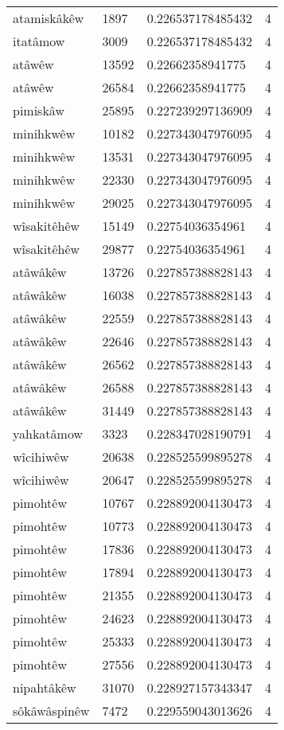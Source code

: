 \begin{longtable}{llll}
atamiskâkêw & 1897 & 0.226537178485432 & 4 \\
itatâmow & 3009 & 0.226537178485432 & 4 \\
atâwêw & 13592 & 0.22662358941775 & 4 \\
atâwêw & 26584 & 0.22662358941775 & 4 \\
pimiskâw & 25895 & 0.227239297136909 & 4 \\
minihkwêw & 10182 & 0.227343047976095 & 4 \\
minihkwêw & 13531 & 0.227343047976095 & 4 \\
minihkwêw & 22330 & 0.227343047976095 & 4 \\
minihkwêw & 29025 & 0.227343047976095 & 4 \\
wîsakitêhêw & 15149 & 0.22754036354961 & 4 \\
wîsakitêhêw & 29877 & 0.22754036354961 & 4 \\
atâwâkêw & 13726 & 0.227857388828143 & 4 \\
atâwâkêw & 16038 & 0.227857388828143 & 4 \\
atâwâkêw & 22559 & 0.227857388828143 & 4 \\
atâwâkêw & 22646 & 0.227857388828143 & 4 \\
atâwâkêw & 26562 & 0.227857388828143 & 4 \\
atâwâkêw & 26588 & 0.227857388828143 & 4 \\
atâwâkêw & 31449 & 0.227857388828143 & 4 \\
yahkatâmow & 3323 & 0.228347028190791 & 4 \\
wîcihiwêw & 20638 & 0.228525599895278 & 4 \\
wîcihiwêw & 20647 & 0.228525599895278 & 4 \\
pimohtêw & 10767 & 0.228892004130473 & 4 \\
pimohtêw & 10773 & 0.228892004130473 & 4 \\
pimohtêw & 17836 & 0.228892004130473 & 4 \\
pimohtêw & 17894 & 0.228892004130473 & 4 \\
pimohtêw & 21355 & 0.228892004130473 & 4 \\
pimohtêw & 24623 & 0.228892004130473 & 4 \\
pimohtêw & 25333 & 0.228892004130473 & 4 \\
pimohtêw & 27556 & 0.228892004130473 & 4 \\
nipahtâkêw & 31070 & 0.228927157343347 & 4 \\
sôkâwâspinêw & 7472 & 0.229559043013626 & 4 \\

\end{longtable}
